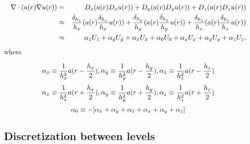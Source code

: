 \documentclass[10pt]{article}
\begin{document}
 \begin{eqnarray*}
 \nabla\cdot(a(r) \nabla u(r)) & = & D_x (a(r) D_x u(r)) + D_y (a(r) D_y u(r)) + D_z (a(r) D_z u(r)) \\
 & \approx & \frac{\delta_{h_x}}{h_x} (a(r) \frac{\delta_{h_x}}{h_x} u(r)) + 
             \frac{\delta_{h_y}}{h_y} (a(r) \frac{\delta_{h_y}}{h_y} u(r)) + 
             \frac{\delta_{h_z}}{h_z} (a(r) \frac{\delta_{h_z}}{h_z} u(r)) \\
 & \approx & \alpha_{\bar{z}}U_{\bar{z}} +  \alpha_{\bar{y}}U_{\bar{y}} +  \alpha_{\bar{x}}U_{\bar{x}} 
  +  \alpha_{0}U_{0} 
  +  \alpha_{x}U_{x} +  \alpha_{y}U_{y} +  \alpha_{z}U_{z},
 \end{eqnarray*}
where

\[\alpha_{\bar{x}}  \equiv  \frac{1}{h_x^2} a(r-\frac{h_x}{2}),
 \alpha_{\bar{y}}  \equiv  \frac{1}{h_y^2} a(r-\frac{h_y}{2}), 
 \alpha_{\bar{z}}  \equiv  \frac{1}{h_z^2} a(r-\frac{h_z}{2}) \]
 \[\alpha_{x}  \equiv  \frac{1}{h_x^2} a(r+\frac{h_x}{2}), 
 \alpha_{y}  \equiv  \frac{1}{h_y^2} a(r+\frac{h_y}{2}),
 \alpha_{z}  \equiv  \frac{1}{h_z^2} a(r+\frac{h_z}{2}) \]
 \[\alpha_{0}   \equiv  - [\alpha_{\bar{x}} + \alpha_{\bar{y}} + \alpha_{\bar{z}} + \alpha_{x} + \alpha_{y} + \alpha_{z}] \]

\subsection{Discretization between levels}
\end{document}
